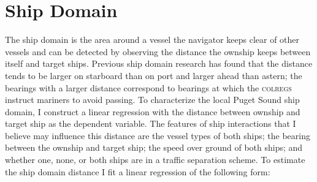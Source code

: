 \documentclass[twoside,symmetric,notoc]{tufte-book}
\begin{document}
\section{Ship Domain}
\label{sec:regress}
\par{%
The ship domain is the area around a vessel the navigator keeps clear of other vessels and can be detected by observing the distance the ownship keeps between itself and target ships. Previous ship domain research has found that the distance tends to be larger on starboard than on port and larger ahead than astern; the bearings with a larger distance correspond to bearings at which the \textsc{colregs} instruct mariners to avoid passing. To characterize the local Puget Sound ship domain, I construct a linear regression with the distance between ownship and target ship as the dependent variable. The features of ship interactions that I believe may influence this distance are the vessel types of both ships; the bearing between the ownship and target ship; the speed over ground of both ships; and whether one, none, or both ships are in a traffic separation scheme. To estimate the ship domain distance I fit a linear regression of the following form:

}
\end{document}
